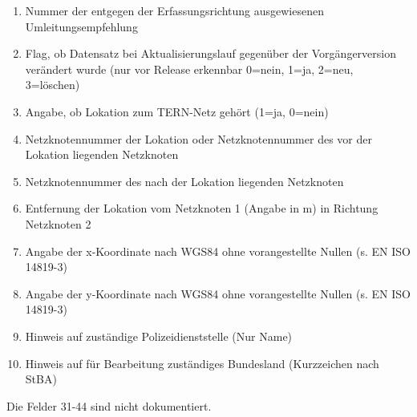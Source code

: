\documentclass[12pt, a4paper, ngerman]{article}
\begin{document}
\begin{enumerate}
	\item Nummer der entgegen der Erfassungsrichtung ausgewiesenen Umleitungsempfehlung
	\item Flag, ob Datensatz bei Aktualisierungslauf gegenüber der Vorgängerversion verändert wurde (nur vor Release erkennbar 0=nein, 1=ja, 2=neu, 3=löschen)
	\item Angabe, ob Lokation zum TERN-Netz gehört (1=ja, 0=nein)
	\item Netzknotennummer der Lokation oder Netzknotennummer des vor der Lokation liegenden Netzknoten
	\item Netzknotennummer des nach der Lokation liegenden Netzknoten
	\item Entfernung der Lokation vom Netzknoten 1 (Angabe in m) in Richtung Netzknoten 2
	\item Angabe der x-Koordinate nach WGS84 ohne vorangestellte Nullen (s. EN ISO 14819-3)
	\item Angabe der y-Koordinate nach WGS84 ohne vorangestellte Nullen (s. EN ISO 14819-3)
	\item Hinweis auf zuständige Polizeidienststelle (Nur Name)
	\item Hinweis auf für Bearbeitung zuständiges Bundesland (Kurzzeichen nach StBA)
	
	
\end{enumerate}	

Die Felder 31-44 sind nicht dokumentiert.


\newpage
\listoffigures
\end{document}
